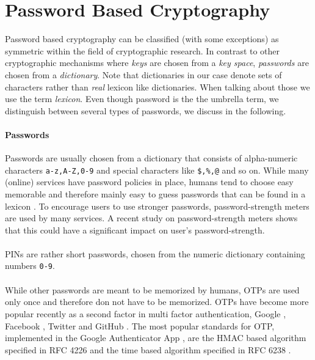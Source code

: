 \section{Password Based Cryptography}
Password based cryptography can be classified (with some exceptions) as symmetric within the field of cryptographic research.
In contrast to other cryptographic mechanisms where \emph{keys} are chosen from a \emph{key space}, \emph{passwords} are chosen from a \emph{dictionary}.
Note that dictionaries in our case denote sets of characters rather than \emph{real} lexicon like dictionaries.
When talking about those we use the term \emph{lexicon}.
Even though password is the the umbrella term, we distinguish between several types of passwords, we discuss in the following.

\paragraph{Passwords}
Passwords are usually chosen from a dictionary that consists of alpha-numeric characters \texttt{a-z,A-Z,0-9} and special characters like \texttt{\$,\%,@} and so on.
While many (online) services have password policies in place, humans tend to choose easy memorable and therefore mainly easy to guess passwords that can be found in a lexicon \cite{Florencio2007,Gaw2006}.
To encourage users to use stronger passwords, password-strength meters are used by many services.
A recent study \cite{Ur2012} on password-strength meters shows that this could have a significant impact on user's password-strength.

\paragraph{}
\acp{PIN} are rather short passwords, chosen from the numeric dictionary containing numbers \texttt{0-9}.

\paragraph{}
While other passwords are meant to be memorized by humans, \acp{OTP} are used only once and therefore don not have to be memorized.
\acp{OTP} have become more popular recently as a second factor in multi factor authentication, \eg Google \cite{Google2Factor}, Facebook \cite{FB2Factor}, Twitter \cite{Twitter2Factor} and GitHub \cite{Github2Factor}.
The most popular standards for \ac{OTP}, implemented \eg in the Google Authenticator App \cite{GAuthenticator}, are the \ac{HMAC} based algorithm specified in RFC 4226 \cite{rfc4226} and the time based algorithm specified in RFC 6238 \cite{rfc6238}.

